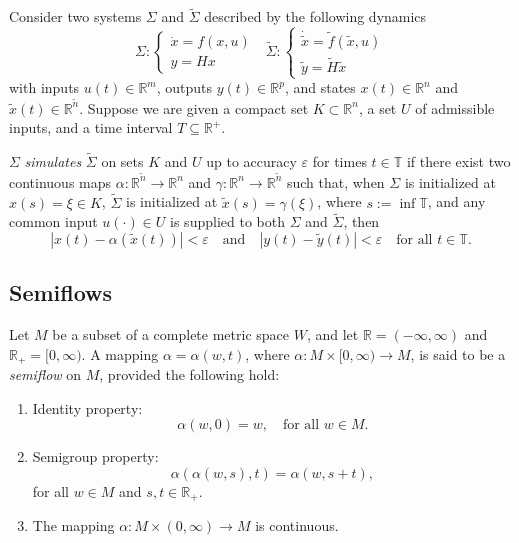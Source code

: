 \documentclass{article}
\newcounter{ct}
\begin{document}
\begin{definition}\label{def:simulation}
Consider two systems $\Sigma$ and $\tilde\Sigma$ described by the following dynamics 
\begin{equation}
    \Sigma: \begin{cases}
        \dot x = f (x, u)\\ y = Hx
    \end{cases}
    \ \ \ 
    \tilde\Sigma: \begin{cases}
        \dot{\tilde x} = \tilde f (\tilde x, u)\\ \tilde y = \tilde H\tilde x
    \end{cases}
\end{equation} 
with inputs $u(t) \in \mathbb{R}^m$, outputs $y(t) \in \mathbb{R}^p$, and states $x(t) \in \mathbb{R}^n$ and $\tilde{x}(t) \in \mathbb{R}^{\tilde{n}}$. Suppose we are given a compact set $K \subset \mathbb{R}^n$, a set $U$ of admissible inputs, and a time interval $T \subseteq \mathbb{R}^+$.

$\Sigma$ \emph{simulates} $\tilde{\Sigma}$ on sets $K$ and $U$ up to accuracy $\varepsilon$ for times $t \in \mathbb{T}$ if there exist two continuous maps $\alpha : \mathbb{R}^{\tilde{n}} \to \mathbb{R}^n$ and $\gamma : \mathbb{R}^n \to \mathbb{R}^{\tilde{n}}$ such that, when $\Sigma$ is initialized at $x(s) = \xi \in K$, $\tilde{\Sigma}$ is initialized at $\tilde{x}(s) = \gamma(\xi)$, where $s := \inf \mathbb{T}$, and any common input $u(\cdot) \in U$ is supplied to both $\Sigma$ and $\tilde{\Sigma}$, then
\[
|x(t) - \alpha(\tilde{x}(t))| < \varepsilon \quad \text{and} \quad |y(t) - \tilde{y}(t)| < \varepsilon \quad \text{for all } t \in \mathbb{T}.
\]
\end{definition}


\subsection{Semiflows \citep{sell2013dynamics}}\label{sec:semiflow}
Let \( M \) be a subset of a complete metric space \( W \), and let \( \mathbb{R} = (-\infty, \infty) \) 
and \( \mathbb{R}_+ = [0, \infty) \). A mapping \( \alpha = \alpha(w,t) \), where 
\( \alpha: M \times [0,\infty) \to M \), is said to be a \textit{semiflow} on \( M \), provided the following hold:

\begin{enumerate}
    \item Identity property: 
    \[
    \alpha(w,0) = w, \quad \text{for all } w \in M.
    \]
    \item Semigroup property: 
    \[
    \alpha(\alpha(w,s),t) = \alpha(w,s+t),
    \]
    for all \( w \in M \) and \( s, t \in \mathbb{R}_+ \).
    \item The mapping \( \alpha: M \times (0,\infty) \to M \) is continuous.
\end{enumerate}
\end{document}
